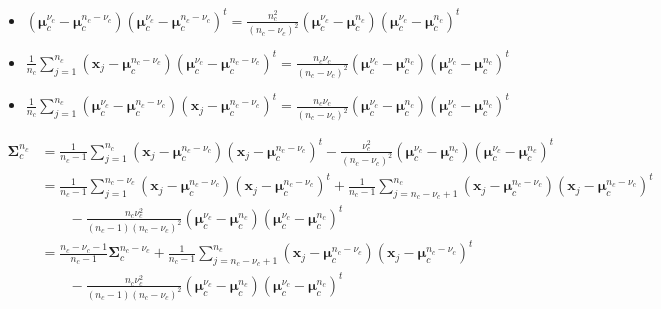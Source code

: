 \documentclass[a4paper,11pt,DIV=16,abstracton]{scrartcl}
\begin{document}
        \begin{itemize}
            \item $(\boldsymbol{\mu}_c^{\nu_c}-\boldsymbol{\mu}_c^{n_c-\nu_c})(\boldsymbol{\mu}_c^{\nu_c}-\boldsymbol{\mu}_c^{n_c-\nu_c})^t = \frac{n_c^2}{(n_c-\nu_c)^2} (\boldsymbol{\mu}_c^{\nu_c}-\boldsymbol{\mu}_c^{n_c})(\boldsymbol{\mu}_c^{\nu_c}-\boldsymbol{\mu}_c^{n_c})^t$
            \item $\frac{1}{n_c} \sum_{j = 1}^{n_c} (\mathbf{x}_j-\boldsymbol{\mu}_c^{n_c-\nu_c})(\boldsymbol{\mu}_c^{\nu_c}-\boldsymbol{\mu}_c^{n_c-\nu_c})^t = \frac{n_c \nu_c}{(n_c-\nu_c)^2} (\boldsymbol{\mu}_c^{\nu_c}-\boldsymbol{\mu}_c^{n_c})(\boldsymbol{\mu}_c^{\nu_c}-\boldsymbol{\mu}_c^{n_c})^t$
            \item $\frac{1}{n_c} \sum_{j = 1}^{n_c} (\boldsymbol{\mu}_c^{\nu_c}-\boldsymbol{\mu}_c^{n_c-\nu_c})(\mathbf{x}_j-\boldsymbol{\mu}_c^{n_c-\nu_c})^t = \frac{n_c \nu_c}{(n_c-\nu_c)^2} (\boldsymbol{\mu}_c^{\nu_c}-\boldsymbol{\mu}_c^{n_c})(\boldsymbol{\mu}_c^{\nu_c}-\boldsymbol{\mu}_c^{n_c})^t$
        \end{itemize}

        \begin{align*}
            \boldsymbol{\Sigma}_c^{n_c} &= \frac{1}{n_c - 1} \sum_{j = 1}^{n_c} (\mathbf{x}_j - \boldsymbol{\mu}_c^{n_c-\nu_c}) (\mathbf{x}_j - \boldsymbol{\mu}_c^{n_c-\nu_c})^t - \frac{\nu_c^2}{(n_c-\nu_c)^2} (\boldsymbol{\mu}_c^{\nu_c}-\boldsymbol{\mu}_c^{n_c})(\boldsymbol{\mu}_c^{\nu_c}-\boldsymbol{\mu}_c^{n_c})^t \\
                           &= \frac{1}{n_c - 1} \sum_{j = 1}^{n_c-\nu_c} (\mathbf{x}_j - \boldsymbol{\mu}_c^{n_c-\nu_c}) (\mathbf{x}_j - \boldsymbol{\mu}_c^{n_c-\nu_c})^t + \frac{1}{n_c - 1} \sum_{j = n_c-\nu_c+1}^{n_c} (\mathbf{x}_j - \boldsymbol{\mu}_c^{n_c-\nu_c}) (\mathbf{x}_j - \boldsymbol{\mu}_c^{n_c-\nu_c})^t \\
                           &\qquad - \frac{n_c \nu_c^2}{(n_c-1)(n_c-\nu_c)^2} (\boldsymbol{\mu}_c^{\nu_c}-\boldsymbol{\mu}_c^{n_c})(\boldsymbol{\mu}_c^{\nu_c}-\boldsymbol{\mu}_c^{n_c})^t \\
                           &= \frac{n_c-\nu_c-1}{n_c-1} \boldsymbol{\Sigma}_c^{n_c-\nu_c} + \frac{1}{n_c - 1} \sum_{j = n_c-\nu_c+1}^{n_c} (\mathbf{x}_j - \boldsymbol{\mu}_c^{n_c-\nu_c}) (\mathbf{x}_j - \boldsymbol{\mu}_c^{n_c-\nu_c})^t \\
                           &\qquad - \frac{n_c \nu_c^2}{(n_c-1)(n_c-\nu_c)^2} (\boldsymbol{\mu}_c^{\nu_c}-\boldsymbol{\mu}_c^{n_c})(\boldsymbol{\mu}_c^{\nu_c}-\boldsymbol{\mu}_c^{n_c})^t \\
        \end{align*}
\end{document}
